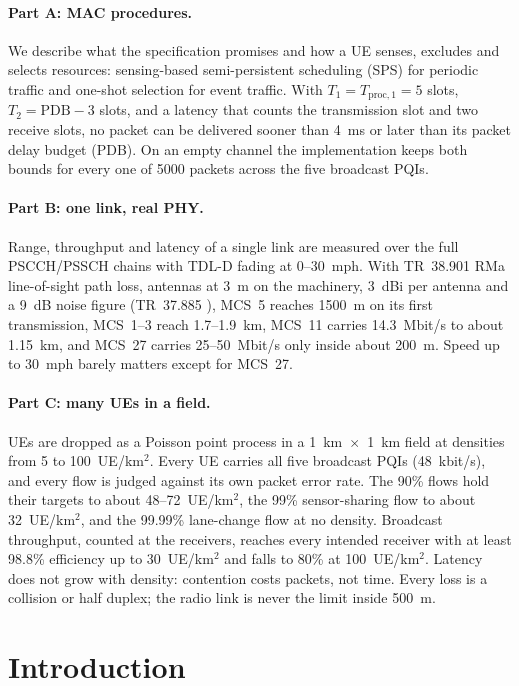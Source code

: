 \documentclass{article}
\newcommand{\Tone}{T_1}
\newcommand{\Ttwo}{T_2}
\newcommand{\Tproc}{T_{\mathrm{proc},1}}
\begin{document}
\paragraph{Part A: MAC procedures.} We describe what the specification
promises and how a UE senses, excludes and selects resources:
sensing-based semi-persistent scheduling (SPS) for periodic traffic and
one-shot selection for event traffic. With $\Tone = \Tproc = 5$ slots,
$\Ttwo = \mathrm{PDB} - 3$ slots, and a latency that counts the
transmission slot and two receive slots, no packet can be delivered
sooner than 4~ms or later than its packet delay budget (PDB). On an
empty channel the implementation keeps both bounds for every one of
5000 packets across the five broadcast PQIs.

\paragraph{Part B: one link, real PHY.} Range, throughput and latency of
a single link are measured over the full PSCCH/PSSCH chains with TDL-D
fading at 0--30~mph. With TR~38.901 RMa line-of-sight path loss, antennas
at 3~m on the machinery, 3~dBi per antenna and a 9~dB noise figure
(TR~37.885 \cite{ref:37885}), MCS~5 reaches 1500~m on its first
transmission, MCS~1--3 reach 1.7--1.9~km, MCS~11 carries 14.3~Mbit/s to
about 1.15~km, and MCS~27 carries 25--50~Mbit/s only inside about 200~m.
Speed up to 30~mph barely matters except for MCS~27.

\paragraph{Part C: many UEs in a field.} UEs are dropped as a Poisson
point process in a 1~km~$\times$~1~km field at densities from 5 to
100~UE/km$^2$. Every UE carries all five broadcast PQIs (48~kbit/s), and
every flow is judged against its own packet error rate. The 90\% flows
hold their targets to about 48--72~UE/km$^2$, the 99\% sensor-sharing
flow to about 32~UE/km$^2$, and the 99.99\% lane-change flow at no
density. Broadcast throughput, counted at the receivers, reaches every
intended receiver with at least 98.8\% efficiency up to 30~UE/km$^2$
and falls to 80\% at 100~UE/km$^2$. Latency does not grow with density:
contention costs packets, not time. Every loss is a collision or half
duplex; the radio link is never the limit inside 500~m.

\section{Introduction}
\label{sec:intro}
\end{document}
